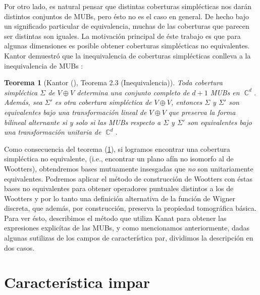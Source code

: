 \documentclass[a4paper]{report}
\DeclareMathOperator{\C}{\mathbb{C}}
\newtheorem{theorem}{Teorema}
\begin{document}
  Por otro lado, es natural pensar que distintas coberturas
  simplécticas nos darán distintos conjuntos de MUBs, pero
  ésto no es el caso en general. De hecho bajo un
  significado particular de equivalencia, muchas de las
  coberturas que parecen ser distintas son iguales. La
  motivación principal de éste trabajo es que para algunas
  dimensiones es posible obtener coberturas simplécticas no
  equivalentes. Kantor demuestró que la inequivalencia de
  coberturas simplécticas conlleva a la inequivalencia de
  MUBs \cite{kantor2012}:
  \begin{theorem}[Kantor (\cite{kantor2012}), Teorema 2.3
    (Inequivalencia)]
    \label{thm:kantor_ineq}
    Toda cobertura simpléctica $\Sigma$ de $V \oplus V$
    determina una conjunto completo de $d+1$ MUBs en
    $\C^{d}$. Además, sea $\Sigma'$ es otra cobertura
    simpléctica de $V \oplus V$, entonces $\Sigma$ y
    $\Sigma'$ son equivalentes bajo una transformación
    lineal de $V \oplus V$ que preserva la forma bilineal
    alternante si y solo si las MUBs respecto a  $\Sigma$ y
    $\Sigma'$ son equivalentes bajo una transformación
    unitaria de $\C^{d}$.
  \end{theorem}

  Como consecuencia del teorema (\ref{thm:kantor_ineq}), si
  logramos encontrar una cobertura simpléctica no
  equivalente, (i.e., encontrar un plano afín no isomorfo al
  de Wootters), obtendremos bases mutuamente insesgadas que
  \textit{no} son unitariamente equivalentes. Podremos
  aplicar el método de construcción de Wootters con éstas
  bases no equivalentes para obtener operadores puntuales
  distintos a los de Wootters y por lo tanto una definición
  alternativa de la función de Wigner discreta, que además,
  por construcción, preserva la propiedad tomográfica
  básica. Para ver ésto, describimos el método que utiliza
  Kanat para obtener las expresiones explicítas de las MUBs,
  y como mencionamos anteriormente, dadas algunas sutilizas
  de los campos de característica par, dividimos la
  descripción en dos casos.
  
  \section{Característica impar}
\end{document}
